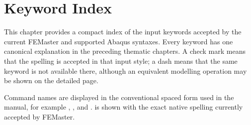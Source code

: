 \chapter{Keyword Index}
\label{chap:keyword-index}

This chapter provides a compact index of the input keywords accepted by the current FEMaster and supported Abaqus syntaxes. Every keyword has one canonical explanation in the preceding thematic chapters. A check mark means that the spelling is accepted in that input style; a dash means that the same keyword is not available there, although an equivalent modelling operation may be shown on the detailed page.

Command names are displayed in the conventional spaced form used in the manual, for example , , and .  is shown with the exact native spelling currently accepted by FEMaster.

